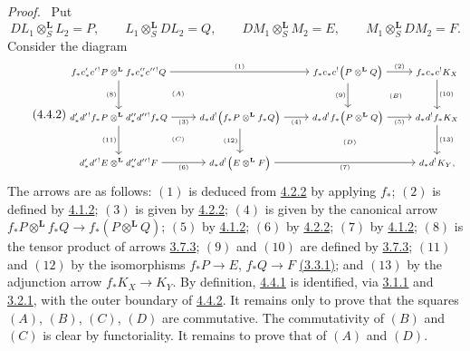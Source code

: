\documentclass[11pt]{article}
\newenvironment{prooftext}[1][Proof]{\par\noindent\emph{#1.}\ }{\par\medskip}
\begin{document}
\begin{prooftext}[Proof]
Put
\[
DL_1\otimes_S^{\mathbf L}L_2=P,\qquad
L_1\otimes_S^{\mathbf L}DL_2=Q,\qquad
DM_1\otimes_S^{\mathbf L}M_2=E,\qquad
M_1\otimes_S^{\mathbf L}DM_2=F.
\]
Consider the diagram
\begin{equation}
\tag{4.4.2}\label{sga5:III:equation:4.4.2}
{\scriptsize
\begin{tikzcd}[column sep=2.6em,row sep=2.6em]
f_*c'_*c'{}^!P\otimes^{\mathbf L} f_*c''_*c''{}^!Q
  \arrow[rr,"(1)"] \arrow[d,"(8)"'] &&
f_*c_*c^!\bigl(P\otimes^{\mathbf L}Q\bigr)
  \arrow[r,"(2)"] \arrow[d,"(9)"'] &
f_*c_*c^!K_X \arrow[d,"(10)"]\\
d'_*d'{}^!f_*P\otimes^{\mathbf L}d''_*d''{}^!f_*Q
  \arrow[r,"(3)"'] \arrow[d,"(11)"'] &
d_*d^!\bigl(f_*P\otimes^{\mathbf L}f_*Q\bigr)
  \arrow[r,"(4)"'] \arrow[d,"(12)"'] &
d_*d^!f_*\bigl(P\otimes^{\mathbf L}Q\bigr)
  \arrow[r,"(5)"'] &
d_*d^!f_*K_X \arrow[d,"(13)"]\\
d'_*d'{}^!E\otimes^{\mathbf L}d''_*d''{}^!F
  \arrow[r,"(6)"'] &
d_*d^!\bigl(E\otimes^{\mathbf L}F\bigr)
  \arrow[rr,"(7)"'] &&
d_*d^!K_Y,
\arrow[from=1-1,to=2-2, phantom, "\scriptstyle (A)"]
\arrow[from=1-3,to=2-4, phantom, "\scriptstyle (B)"]
\arrow[from=2-1,to=3-2, phantom, "\scriptstyle (C)"]
\arrow[from=2-2,to=3-4, phantom, "\scriptstyle (D)"]
\end{tikzcd}
}
\end{equation}
The arrows are as follows: $(1)$ is deduced from \hyperref[sga5:III:equation:4.2.2]{4.2.2} by applying $f_*$; $(2)$ is defined by \hyperref[sga5:III:equation:4.1.2]{4.1.2}; $(3)$ is given by \hyperref[sga5:III:equation:4.2.2]{4.2.2}; $(4)$ is given by the canonical arrow $f_*P\otimes^{\mathbf L}f_*Q\longrightarrow f_*(P\otimes^{\mathbf L}Q)$; $(5)$ by \hyperref[sga5:III:equation:4.1.2]{4.1.2}; $(6)$ by \hyperref[sga5:III:equation:4.2.2]{4.2.2}; $(7)$ by \hyperref[sga5:III:equation:4.1.2]{4.1.2}; $(8)$ is the tensor product of arrows \hyperref[sga5:III:equation:3.7.3]{3.7.3}; $(9)$ and $(10)$ are defined by \hyperref[sga5:III:equation:3.7.3]{3.7.3}; $(11)$ and $(12)$ by the isomorphisms $f_*P\longrightarrow E$, $f_*Q\longrightarrow F$ \hyperref[sga5:III:equation:3.3.1]{(3.3.1)}; and $(13)$ by the adjunction arrow $f_*K_X\longrightarrow K_Y$. By definition, \hyperref[sga5:III:equation:4.4.1]{4.4.1} is identified, via \hyperref[sga5:III:equation:3.1.1]{3.1.1} and \hyperref[sga5:III:equation:3.2.1]{3.2.1}, with the outer boundary of \hyperref[sga5:III:equation:4.4.2]{4.4.2}. It remains only to prove that the squares $(A)$, $(B)$, $(C)$, $(D)$ are commutative. The commutativity of $(B)$ and $(C)$ is clear by functoriality. It remains to prove that of $(A)$ and $(D)$.


\end{prooftext}
\end{document}
